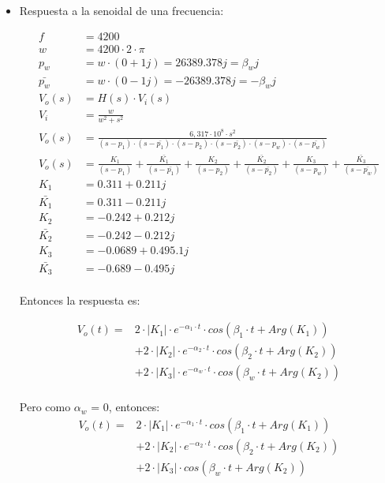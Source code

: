\documentclass[11pt]{diazessay} %
\begin{document}
\begin{itemize}
\newpage
\item Respuesta a la senoidal de una frecuencia:


\begin{align*}
f &= 4200 \\[10pt]
w &= 4200 \cdot 2 \cdot \pi \\[10pt]
p_{w} &= w \cdot (0 + 1j) = 26389.378 j = \beta_{w} j\\[10pt]
\bar{p_{w}} &= w \cdot (0 - 1j)  = -26389.378 j = - \beta_{w} j\\[10pt]
V_{o}(s) &= H(s) \cdot V_{i}(s)\\[10pt]
V_{i} &= \frac{w}{w^{2} + s^{2}} \\[10pt]
V_{o}(s) &= \frac{6,317 \cdot 10^8 \cdot s^2}{(s - p_{1}) \cdot (s - \bar{p_{1}}) \cdot (s - p_{2}) \cdot (s - \bar{p_{2}}) \cdot (s - p_{w}) \cdot (s - \bar{p_{w}})} \\[10pt]
V_{o}(s) &= \frac{K_{1}}{(s - p_{1})} + \frac{\bar{K_{1}}}{(s - \bar{p_{1}})} +  \frac{K_{2}}{(s - p_{2})} + \frac{\bar{K_{2}}}{(s - \bar{p_{2}})} +  \frac{K_{3}}{(s - p_{w})} +  \frac{\bar{K_{3}}}{(s - \bar{p_{w}})}\\[10pt]
K_{1} &= 0.311 + 0.211 j \\[10pt]
\bar{K_{1}} &= 0.311 - 0.211 j \\[10pt]
K_{2} &= -0.242 + 0.212 j \\[10pt]
\bar{K_{2}} &= -0.242 - 0.212 j \\[10pt]
K_{3} &= -0.0689 + 0.495.1 j \\[10pt]
\bar{K_{3}} &= -0.689 - 0.495 j \\[10pt]
\end{align*}

Entonces la respuesta es:

\begin{align*}
V_{o}(t) = &2 \cdot |K_{1}| \cdot e^{- \alpha_{1} \cdot t} \cdot cos(\beta_{1} \cdot t + Arg(K_{1})) \\
&+  2 \cdot |K_{2}| \cdot e^{- \alpha_{2} \cdot t} \cdot cos(\beta_{2} \cdot t + Arg(K_{2}))\\
&+  2 \cdot |K_{3}| \cdot e^{- \alpha_{w} \cdot t} \cdot cos(\beta_{w} \cdot t + Arg(K_{2}))\\
\end{align*}

Pero como $\alpha_{w}$ = 0, entonces: 
\begin{align*}
V_{o}(t) = &2 \cdot |K_{1}| \cdot e^{- \alpha_{1} \cdot t} \cdot cos(\beta_{1} \cdot t + Arg(K_{1})) \\
&+  2 \cdot |K_{2}| \cdot e^{- \alpha_{2} \cdot t} \cdot cos(\beta_{2} \cdot t + Arg(K_{2}))\\
&+  2 \cdot |K_{3}| \cdot cos(\beta_{w} \cdot t + Arg(K_{2}))\\[10pt]
\end{align*}

\end{itemize}
\end{document}
